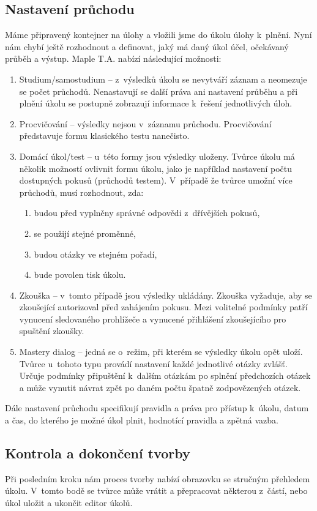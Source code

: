 \documentclass[
print,
  11pt,
  table,   
  nolof,    
  nolot,
  oneside,final
]{fithesis3}
\begin{document}
\subsection*{Nastavení průchodu}
Máme připravený kontejner na úlohy a vložili jsme do úkolu úlohy k~plnění. Nyní nám chybí ještě rozhodnout a definovat, jaký má daný úkol účel, očekávaný průběh a výstup. Maple T.A. nabízí následující možnosti: 
\begin{enumerate}
	\item Studium/samostudium -- z~výsledků úkolu se nevytváří záznam a neomezuje se počet průchodů. Nenastavují se další práva ani nastavení průběhu a při plnění úkolu se postupně zobrazují informace k~řešení jednotlivých úloh.
	\item Procvičování -- výsledky nejsou v~záznamu průchodu. Procvičování představuje formu klasického testu nanečisto.
	\item Domácí úkol/test -- u~této formy jsou výsledky uloženy. Tvůrce úkolu má několik možností ovlivnit formu úkolu, jako je například nastavení počtu dostupných pokusů (průchodů testem). V~případě že tvůr\-ce umožní více průchodů, musí rozhodnout, zda:
	\begin{enumerate}
		\item budou před vyplněny správné odpovědi z~dřívějších pokusů, 
		\item se použijí stejné proměnné, 
		\item budou otázky ve stejném pořadí, 
		\item bude povolen tisk úkolu.
	\end{enumerate}
	\item Zkouška -- v~tomto případě jsou výsledky ukládány. Zkouš\-ka vyžaduje, aby se zkoušející autorizoval před zahájením pokusu. Mezi volitelné podmínky patří vynucení sledovaného prohlížeče a vynucené přihlášení zkoušejícího pro spuštění zkoušky.
	\item Mastery dialog -- jedná se o~režim, při kterém se výsledky úkolu opět uloží. Tvůr\-ce u~tohoto typu provádí nastavení každé jednotlivé otáz\-ky zvlášť. Určuje podmínky připuštění k~dalším otázkám po splnění předchozích otázek a může vynutit návrat zpět po daném počtu špat\-ně zodpovězených otázek.
\end{enumerate}
Dále nastavení průchodu specifikují pravidla a práva pro přístup k~úkolu, datum a čas, do kterého je možné úkol plnit, hodnotící pravidla a zpětná vazba.
 
\subsection*{Kontrola a dokončení tvorby}
Při posledním kroku nám proces tvorby nabízí obrazovku se stručným přehledem úkolu. V~tomto bodě se tvůrce může vrátit a přepracovat některou z~částí, nebo úkol uložit a ukončit editor úkolů.
\end{document}
